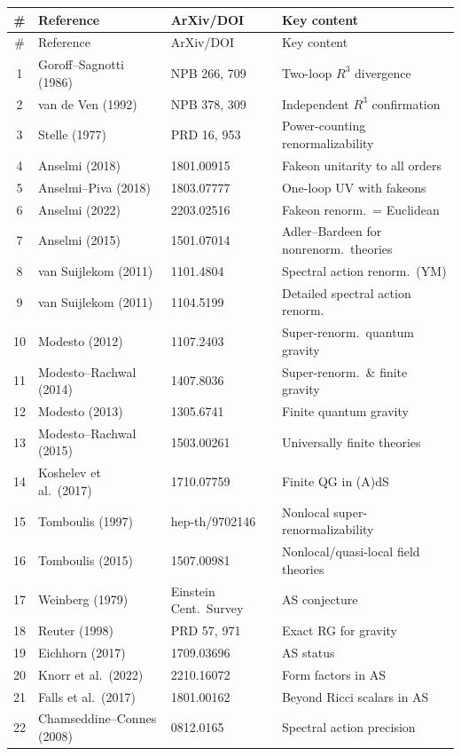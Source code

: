 \documentclass[12pt,a4paper]{article}
\begin{document}
\begin{longtable}{cllp{6cm}}
\toprule
\# & Reference & ArXiv/DOI & Key content \\
\midrule
\endfirsthead
\toprule
\# & Reference & ArXiv/DOI & Key content \\
\midrule
\endhead
1 & Goroff--Sagnotti (1986) & NPB 266, 709 & Two-loop $R^3$ divergence \\
2 & van de Ven (1992) & NPB 378, 309 & Independent $R^3$ confirmation \\
3 & Stelle (1977) & PRD 16, 953 & Power-counting renormalizability \\
4 & Anselmi (2018) & 1801.00915 & Fakeon unitarity to all orders \\
5 & Anselmi--Piva (2018) & 1803.07777 & One-loop UV with fakeons \\
6 & Anselmi (2022) & 2203.02516 & Fakeon renorm.\ = Euclidean \\
7 & Anselmi (2015) & 1501.07014 & Adler--Bardeen for nonrenorm.\ theories \\
8 & van Suijlekom (2011) & 1101.4804 & Spectral action renorm.\ (YM) \\
9 & van Suijlekom (2011) & 1104.5199 & Detailed spectral action renorm. \\
10 & Modesto (2012) & 1107.2403 & Super-renorm.\ quantum gravity \\
11 & Modesto--Rachwal (2014) & 1407.8036 & Super-renorm.\ \& finite gravity \\
12 & Modesto (2013) & 1305.6741 & Finite quantum gravity \\
13 & Modesto--Rachwal (2015) & 1503.00261 & Universally finite theories \\
14 & Koshelev et al.\ (2017) & 1710.07759 & Finite QG in (A)dS \\
15 & Tomboulis (1997) & hep-th/9702146 & Nonlocal super-renormalizability \\
16 & Tomboulis (2015) & 1507.00981 & Nonlocal/quasi-local field theories \\
17 & Weinberg (1979) & Einstein Cent.\ Survey & AS conjecture \\
18 & Reuter (1998) & PRD 57, 971 & Exact RG for gravity \\
19 & Eichhorn (2017) & 1709.03696 & AS status \\
20 & Knorr et al.\ (2022) & 2210.16072 & Form factors in AS \\
21 & Falls et al.\ (2017) & 1801.00162 & Beyond Ricci scalars in AS \\
22 & Chamseddine--Connes (2008) & 0812.0165 & Spectral action precision \\

\end{longtable}
\end{document}
